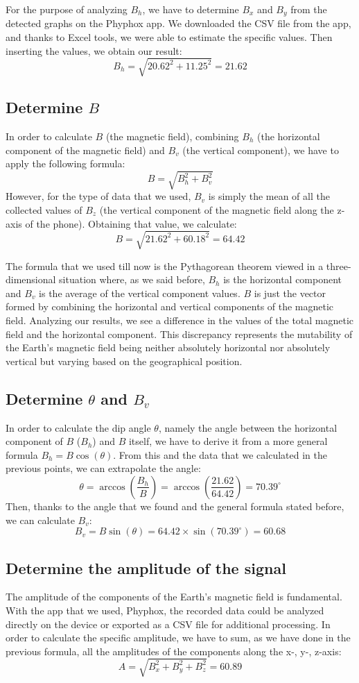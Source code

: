 \documentclass[notitlepage]{report}
\newcounter{theo}[section]\setcounter{theo}{0}
\numberwithin{equation}{section}
\theoremstyle{plain}
\theoremstyle{definition}
\theoremstyle{remark}
\begin{document}
For the purpose of analyzing $B_h$, we have to determine $B_x$ and $B_y$ from the detected graphs on the Phyphox app. We downloaded the CSV file from the app, and thanks to Excel tools, we were able to estimate the specific values. Then inserting the values, we obtain our result: 
\[ B_h = \sqrt{20.62^2 + 11.25^2} = 21.62 \]

\subsection{Determine $B$}
In order to calculate $B$ (the magnetic field), combining $B_h$ (the horizontal component of the magnetic field) and $B_v$ (the vertical component), we have to apply the following formula:
\[ B = \sqrt{B_h^2 + B_v^2} \]
However, for the type of data that we used, $B_v$ is simply the mean of all the collected values of $B_z$ (the vertical component of the magnetic field along the z-axis of the phone). Obtaining that value, we calculate:
\[ B = \sqrt{21.62^2 + 60.18^2} = 64.42 \]

The formula that we used till now is the Pythagorean theorem viewed in a three-dimensional situation where, as we said before, $B_h$ is the horizontal component and $B_v$ is the average of the vertical component values.
$B$ is just the vector formed by combining the horizontal and vertical components of the magnetic field. Analyzing our results, we see a difference in the values of the total magnetic field and the horizontal component. This discrepancy represents the mutability of the Earth’s magnetic field being neither absolutely horizontal nor absolutely vertical but varying based on the geographical position.

\subsection{Determine $\theta$ and $B_v$}
In order to calculate the dip angle $\theta$, namely the angle between the horizontal component of $B$ ($B_h$) and $B$ itself, we have to derive it from a more general formula $B_h = B \cos(\theta)$.
From this and the data that we calculated in the previous points, we can extrapolate the angle:
\[ \theta = \arccos\left(\frac{B_h}{B}\right) = \arccos\left(\frac{21.62}{64.42}\right) = 70.39^\circ \]
Then, thanks to the angle that we found and the general formula stated before, we can calculate $B_v$:
\[ B_v = B \sin(\theta) = 64.42 \times \sin(70.39^\circ) = 60.68 \]

\subsection{Determine the amplitude of the signal}
The amplitude of the components of the Earth’s magnetic field is fundamental. With the app that we used, Phyphox, the recorded data could be analyzed directly on the device or exported as a CSV file for additional processing.
In order to calculate the specific amplitude, we have to sum, as we have done in the previous formula, all the amplitudes of the components along the x-, y-, z-axis:
\[ A = \sqrt{B_x^2 + B_y^2 + B_z^2} = 60.89 \]
\end{document}

